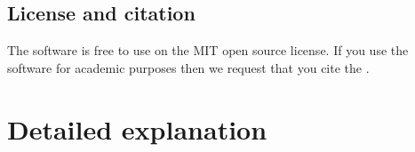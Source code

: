 \documentclass[letterpaper,10pt,english]{sphinxmanual}
\begin{document}
\section{License and citation}
\label{\detokenize{basics:license-and-citation}}
\sphinxAtStartPar
The software is free to use on the MIT open source license. If you use the software for academic purposes then we request that you cite
the .

\sphinxstepscope


\chapter{Detailed explanation}
\label{\detokenize{detexp:detailed-explanation}}\label{\detokenize{detexp::doc}}
\end{document}

